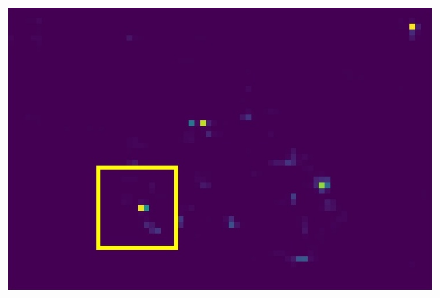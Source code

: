 \begin{figure}[h!]
{\begin{minipage}[t]{3.5cm}
		\end{minipage}
		\begin{minipage}[t]{3.5cm}
			\centering
			\includegraphics[width=0.9\linewidth]{figures/pixel/map3_3}
	\end{minipage}}
	

\end{figure}
